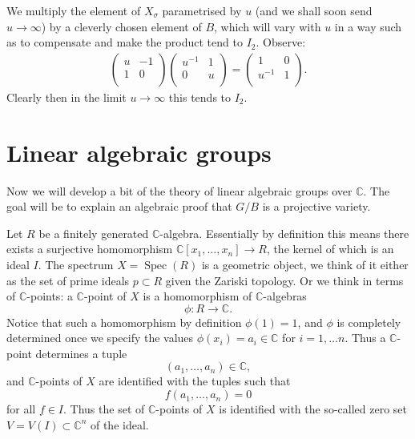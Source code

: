 \documentclass[12pt]{article}
\theoremstyle{plain}
\theoremstyle{definition}
\numberwithin{equation}{section}
\DeclareMathOperator{\spec}{Spec}
\newcommand{\C}{\mathbb{C}}
\begin{document}
We multiply the element of $X_\sigma$ parametrised by $u$ (and we shall soon send $u \rightarrow \infty$) by a cleverly chosen element of $B$, which will vary with $u$ in a way such as to compensate and make the product tend to $I_2$. Observe:
\begin{align*}
\left(
\begin{array}{cc}
u & -1 \\
1 & 0 \\
\end{array}
\right) \left(
\begin{array}{cc}
u^{-1} & 1 \\
0 & u \\
\end{array}
\right) = \left(
\begin{array}{cc}
1 & 0 \\
u^{-1} & 1 \\
\end{array}
\right).
\end{align*}
Clearly then in the limit $u \rightarrow \infty$ this tends to $I_2$.





\section{Linear algebraic groups}\label{sec:lin.alg.grp}

Now we will develop a bit of the theory of linear algebraic groups over $\C$. The goal will be to explain an algebraic proof that $G / B$ is a projective variety.


Let $R$ be a finitely generated $\C$-algebra. Essentially by definition this means there exists a surjective homomorphism $\C[x_1, \ldots, x_n] \rightarrow R$, the kernel of which is an ideal $I$. The spectrum $X = \spec(R)$ is a geometric object, we think of it either as the set of prime ideals $p \subset R$ given the Zariski topology. Or we think in terms of $\C$-points: a $\C$-point of $X$ is a homomorphism of $\C$-algebras
\[
\phi: R \rightarrow \C.
\]
Notice that such a homomorphism by definition $\phi(1) = 1$, and $\phi$ is completely determined once we specify the values $\phi(x_i) = a_i \in \C$ for $i=1, \ldots n$. Thus a $\C$-point determines a tuple
\[
(a_1, \ldots, a_n) \in \C,
\]
and $\C$-points of $X$ are identified with the tuples such that
\[
f(a_1, \ldots, a_n) = 0
\]
for all $f \in I$. Thus the set of $\C$-points of $X$ is identified with the so-called zero set $V = V(I) \subset \C^n$ of the ideal.
\end{document}
